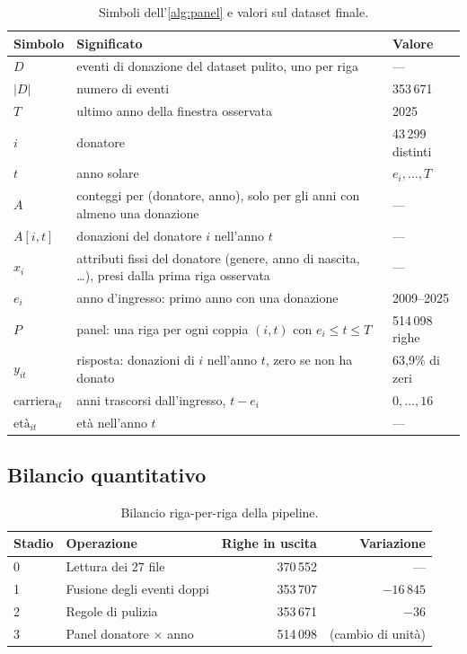 \begin{table}[H]
\centering
\small
\caption{Simboli dell'\cref{alg:panel} e valori sul dataset finale.}
\label{tab:panel_simboli}
\begin{tabularx}{\linewidth}{@{}l X l@{}}
\toprule
\textbf{Simbolo} & \textbf{Significato} & \textbf{Valore} \\
\midrule
$D$ & eventi di donazione del dataset pulito, uno per riga & --- \\
$|D|$ & numero di eventi & 353\,671 \\
$T$ & ultimo anno della finestra osservata & 2025 \\
$i$ & donatore & 43\,299 distinti \\
$t$ & anno solare & $e_i,\dots,T$ \\
$A$ & conteggi per (donatore, anno), solo per gli anni con almeno una donazione & --- \\
$A[i,t]$ & donazioni del donatore $i$ nell'anno $t$ & --- \\
$x_i$ & attributi fissi del donatore (genere, anno di nascita, \ldots), presi dalla prima riga osservata & --- \\
$e_i$ & anno d'ingresso: primo anno con una donazione & 2009--2025 \\
$P$ & panel: una riga per ogni coppia $(i,t)$ con $e_i \le t \le T$ & 514\,098 righe \\
$y_{it}$ & risposta: donazioni di $i$ nell'anno $t$, zero se non ha donato & 63{,}9\% di zeri \\
$\text{carriera}_{it}$ & anni trascorsi dall'ingresso, $t - e_i$ & $0,\dots,16$ \\
$\text{età}_{it}$ & età nell'anno $t$ & --- \\
\bottomrule
\end{tabularx}
\end{table}

\subsection{Bilancio quantitativo}
\label{sec:phaselog}

\begin{table}[ht]
\centering
\caption{Bilancio riga-per-riga della pipeline.}
\label{tab:cleaninglog}
\begin{tabular}{@{}llrr@{}}
\toprule
\textbf{Stadio} & \textbf{Operazione} & \textbf{Righe in uscita} & \textbf{Variazione} \\
\midrule
0 & Lettura dei 27 file          & 370\,552 & ---          \\
1 & Fusione degli eventi doppi   & 353\,707 & $-16\,845$   \\
2 & Regole di pulizia            & 353\,671 & $-36$        \\
3 & Panel donatore $\times$ anno & 514\,098 & (cambio di unità) \\
\bottomrule
\end{tabular}
\end{table}

